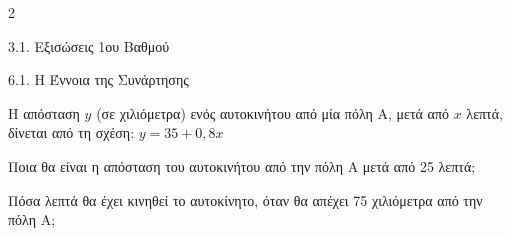 \begin{ylh}{2}
    \item 3.1. Εξισώσεις 1ου Βαθμού
    \item 6.1. Η Έννοια της Συνάρτησης
\end{ylh}
Η απόσταση $y$ (σε χιλιόμετρα) ενός αυτοκινήτου από μία πόλη Α, μετά από $x$ λεπτά, δίνεται από τη σχέση: $y = 35 + 0,8x$
\begin{alist}
\item Ποια θα είναι η απόσταση του αυτοκινήτου από την πόλη Α μετά από 25 λεπτά;
\item Πόσα λεπτά θα έχει κινηθεί το αυτοκίνητο, όταν θα απέχει 75 χιλιόμετρα από την πόλη Α;
\end{alist}

